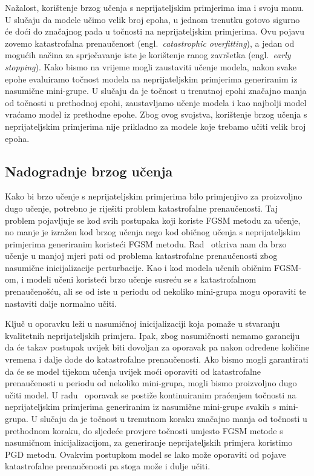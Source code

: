 \documentclass[times, utf8, zavrsni, numeric]{fer}
\begin{document}
Nažalost, korištenje brzog učenja s neprijateljskim primjerima ima i svoju manu. U slučaju da modele učimo velik broj epoha,
u jednom trenutku gotovo sigurno će doći do značajnog pada u točnosti na neprijateljskim primjerima. Ovu pojavu zovemo katastrofalna prenaučenost (engl.\ \textit{catastrophic overfitting}),
a jedan od mogućih načina za sprječavanje iste je korištenje ranog završetka (engl.\ \textit{early stopping}). 
Kako bismo na vrijeme mogli zaustaviti učenje modela, nakon svake epohe evaluiramo točnost modela na neprijateljskim primjerima generiranim iz nasumične mini-grupe.
U slučaju da je točnost u trenutnoj epohi značajno manja od točnosti u prethodnoj epohi, zaustavljamo učenje modela i kao najbolji model vraćamo model iz prethodne epohe.
Zbog ovog svojstva, korištenje brzog učenja s neprijateljskim primjerima nije prikladno za modele koje trebamo učiti velik broj epoha.

\subsection{Nadogradnje brzog učenja}

Kako bi brzo učenje s neprijateljskim primjerima bilo primjenjivo za proizvoljno dugo učenje, potrebno je riješiti problem katastrofalne prenaučenosti.
Taj problem pojavljuje se kod svih postupaka koji koriste FGSM metodu za učenje, no manje je izražen kod brzog učenja nego kod običnog učenja s neprijateljskim primjerima generiranim koristeći FGSM metodu.
Rad~\cite{li2020towards} otkriva nam da brzo učenje u manjoj mjeri pati od problema katastrofalne prenaučenosti zbog nasumične inicijalizacije perturbacije.
Kao i kod modela učenih običnim FGSM-om, i modeli učeni koristeći brzo učenje susreću se s katastrofalnom prenaučenošću, ali se od iste u periodu od nekoliko mini-grupa mogu oporaviti te nastaviti dalje normalno učiti.

Ključ u oporavku leži u nasumičnoj inicijalizaciji koja pomaže u stvaranju kvalitetnih neprijateljskih primjera. 
Ipak, zbog nasumičnosti nemamo garanciju da će takav postupak uvijek biti dovoljan za oporavak pa nakon određene količine vremena i dalje dođe do katastrofalne prenaučenosti.
Ako bismo mogli garantirati da će se model tijekom učenja uvijek moći oporaviti od katastrofalne prenaučenosti u periodu od nekoliko mini-grupa, mogli bismo proizvoljno dugo učiti model.
U radu~\cite{li2020towards} oporavak se postiže kontinuiranim praćenjem točnosti na neprijateljskim primjerima generiranim iz nasumične mini-grupe svakih $s$ mini-grupa. 
U slučaju da je točnost u trenutnom koraku značajno manja od točnosti u prethodnom koraku, do sljedeće provjere točnosti umjesto FGSM metode s nasumičnom inicijalizacijom, za generiranje neprijateljskih primjera koristimo PGD metodu.
Ovakvim postupkom model se lako može oporaviti od pojave katastrofalne prenaučenosti pa stoga može i dulje učiti.
\end{document}
